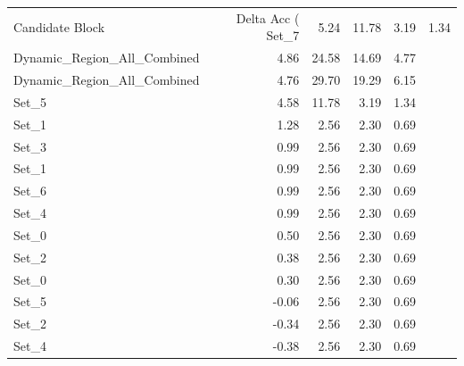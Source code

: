 \begin{tabular}{lrrrr}
\toprule
Candidate Block & Delta Acc (%
\midrule
Set_7 & 5.24 & 11.78 & 3.19 & 1.34 \\
Dynamic_Region_All_Combined & 4.86 & 24.58 & 14.69 & 4.77 \\
Dynamic_Region_All_Combined & 4.76 & 29.70 & 19.29 & 6.15 \\
Set_5 & 4.58 & 11.78 & 3.19 & 1.34 \\
Set_1 & 1.28 & 2.56 & 2.30 & 0.69 \\
Set_3 & 0.99 & 2.56 & 2.30 & 0.69 \\
Set_1 & 0.99 & 2.56 & 2.30 & 0.69 \\
Set_6 & 0.99 & 2.56 & 2.30 & 0.69 \\
Set_4 & 0.99 & 2.56 & 2.30 & 0.69 \\
Set_0 & 0.50 & 2.56 & 2.30 & 0.69 \\
Set_2 & 0.38 & 2.56 & 2.30 & 0.69 \\
Set_0 & 0.30 & 2.56 & 2.30 & 0.69 \\
Set_5 & -0.06 & 2.56 & 2.30 & 0.69 \\
Set_2 & -0.34 & 2.56 & 2.30 & 0.69 \\
Set_4 & -0.38 & 2.56 & 2.30 & 0.69 \\
\bottomrule
\end{tabular}
